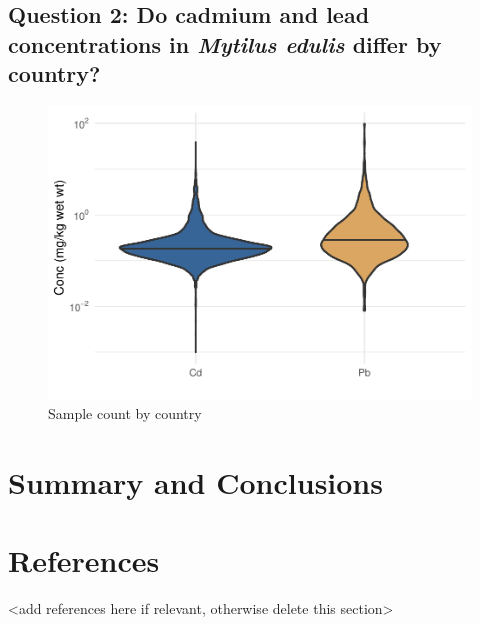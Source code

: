 \documentclass[
  12pt,
]{article}
\begin{document}
\hypertarget{question-2-do-cadmium-and-lead-concentrations-in-mytilus-edulis-differ-by-country}{%
\subsection{\texorpdfstring{Question 2: Do cadmium and lead
concentrations in \emph{Mytilus edulis} differ by
country?}{Question 2: Do cadmium and lead concentrations in Mytilus edulis differ by country?}}\label{question-2-do-cadmium-and-lead-concentrations-in-mytilus-edulis-differ-by-country}}

\begin{figure}
\centering
\includegraphics{McCrory_ENV972_Project_files/figure-latex/unnamed-chunk-5-1.pdf}
\caption{Sample count by country}
\end{figure}

\newpage

\hypertarget{summary-and-conclusions}{%
\section{Summary and Conclusions}\label{summary-and-conclusions}}

\newpage

\hypertarget{references}{%
\section{References}\label{references}}

\textless add references here if relevant, otherwise delete this
section\textgreater{}
\end{document}
